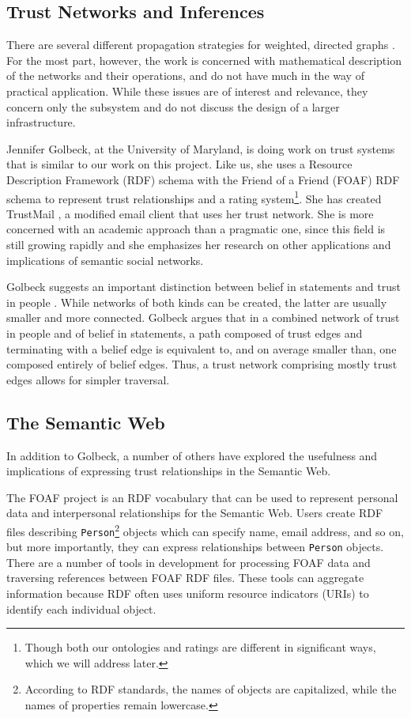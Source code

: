 \documentclass[letterpaper]{www2006-submission}
\begin{document}
\subsection{Trust Networks and Inferences}
There are several different propagation strategies for weighted, directed graphs \citep{richardson03management} \citep{abdul-rahman:relying} \citep{guha04propagation}.  For the most part, however, the work is concerned with mathematical description of the networks and their operations, and do not have much in the way of practical application.  While these issues are of interest and relevance, they concern only the subsystem and do not discuss the design of a larger infrastructure.

Jennifer Golbeck, at the University of Maryland, is doing work on trust systems \citep{golbeckDissertation} that is similar to our work on this project.  Like us, she uses a Resource Description Framework (RDF) \citep{rdf} schema with the Friend of a Friend (FOAF) \citep{foafProject} RDF schema to represent trust relationships and a rating system\footnote{Though both our ontologies and ratings are different in significant ways, which we will address later.}.  She has created TrustMail \citep{trustMail}, a modified email client that uses her trust network.  She is more concerned with an academic approach than a pragmatic one, since this field is still growing rapidly and she emphasizes her research on other applications and implications of semantic social networks.

Golbeck suggests an important distinction between belief in statements and trust in people \citep{golbeck:accuracy}.  While networks of both kinds can be created, the latter are usually smaller and more connected.  Golbeck argues that in a combined network of trust in people and of belief in statements, a path composed of trust edges and terminating with a belief edge is equivalent to, and on average smaller than, one composed entirely of belief edges.  Thus, a trust network comprising mostly trust edges allows for simpler traversal.

\subsection{The Semantic Web}
In addition to Golbeck, a number of others have explored the usefulness and implications of expressing trust relationships in the Semantic Web.

\label{foaf}
The FOAF project is an RDF vocabulary that can be used to represent personal data and interpersonal relationships for the Semantic Web.  Users create RDF files describing \texttt{Person}\footnote{According to RDF standards, the names of objects are capitalized, while the names of properties remain lowercase.} objects which can specify name, email address, and so on, but more importantly, they can express relationships between \texttt{Person} objects.  There are a number of tools in development for processing FOAF data and traversing references between FOAF RDF files.  These tools can aggregate information because RDF often uses uniform resource indicators (URIs) to identify each individual object.
\end{document}
